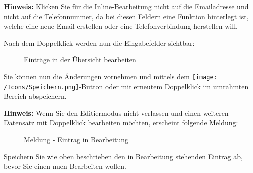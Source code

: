 \vspace{\baselineskip}

\textbf{Hinweis:} Klicken Sie für die Inline-Bearbeitung nicht auf die Emailadresse und nicht auf die Telefonnummer, da bei diesen Feldern eine Funktion hinterlegt ist, welche eine neue Email erstellen oder eine Telefonverbindung herstellen will.

\vspace{\baselineskip}

Nach dem Doppelklick werden nun die Eingabefelder sichtbar:

\begin{figure}[H]
\caption{Einträge in der Übersicht bearbeiten}
\end{figure}

Sie können nun die Änderungen vornehmen und mittels dem \texttt{[image: /Icons/Speichern.png]}-Button oder mit erneutem Doppelklick im umrahmten Bereich abspeichern.

\vspace{\baselineskip}

\textbf{Hinweis:} Wenn Sie den Editiermodus nicht verlassen und einen weiteren Datensatz mit Doppelklick bearbeiten möchten, erscheint folgende Meldung:

\begin{figure}[H]
\caption{Meldung - Eintrag in Bearbeitung}
\end{figure}

Speichern Sie wie oben beschrieben den in Bearbeitung stehenden Eintrag ab, bevor Sie einen nuen Bearbeiten wollen.

\vspace{\baselineskip}

